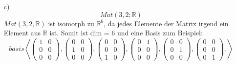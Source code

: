 \documentclass{article}
\begin{document}
\begin{enumerate}
        \item[c)] \[Mat(3,2;\mathbb{R})\]
        \newline
        $Mat(3,2,\mathbb{R})$ ist isomorph zu $\mathbb{R}^6$, da jedes 
        Elemente der Matrix irgend ein Element aus $\mathbb{R}$ ist.
        Somit ist dim = 6 und eine Basis zum Beispiel:
        \[basis\left<
        \left(\begin{array}{cc}1&0\\0&0\\0&0\end{array}\right),
        \left(\begin{array}{cc}0&0\\1&0\\0&0\end{array}\right),
        \left(\begin{array}{cc}0&0\\0&0\\1&0\end{array}\right),
        \left(\begin{array}{cc}0&1\\0&0\\0&0\end{array}\right),
        \left(\begin{array}{cc}0&0\\0&1\\0&0\end{array}\right),
        \left(\begin{array}{cc}0&0\\0&0\\0&1\end{array}\right),\right>\]


\end{enumerate}
\end{document}
